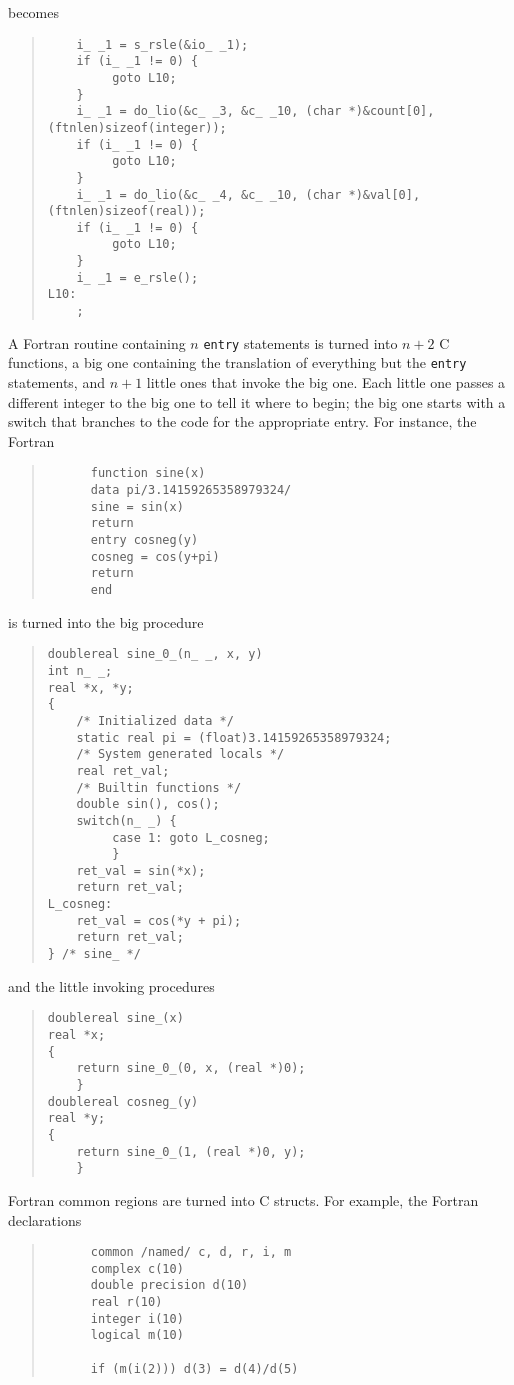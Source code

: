 \documentclass[12pt]{article}
\begin{document}
becomes
\begin{quote}
\begin{verbatim}
    i_ _1 = s_rsle(&io_ _1);
    if (i_ _1 != 0) {
         goto L10;
    }
    i_ _1 = do_lio(&c_ _3, &c_ _10, (char *)&count[0], (ftnlen)sizeof(integer));
    if (i_ _1 != 0) {
         goto L10;
    }
    i_ _1 = do_lio(&c_ _4, &c_ _10, (char *)&val[0], (ftnlen)sizeof(real));
    if (i_ _1 != 0) {
         goto L10;
    }
    i_ _1 = e_rsle();
L10:
    ;
\end{verbatim}
\end{quote}

A Fortran routine containing $n$ \verb|entry| statements is turned into $n + 2$ C functions, a big one containing the translation of everything but the \verb|entry| statements, and $n + 1$ little ones that invoke the big one. Each little one passes a different integer to the big one to tell it where to begin; the big one starts with a switch that branches to the code for the appropriate entry. For instance, the Fortran
\begin{quote}
\begin{verbatim}
      function sine(x)
      data pi/3.14159265358979324/
      sine = sin(x)
      return
      entry cosneg(y)
      cosneg = cos(y+pi)
      return
      end
\end{verbatim}
\end{quote}
is turned into the big procedure
\begin{quote}
\begin{verbatim}
doublereal sine_0_(n_ _, x, y)
int n_ _;
real *x, *y;
{
    /* Initialized data */
    static real pi = (float)3.14159265358979324;
    /* System generated locals */
    real ret_val;
    /* Builtin functions */
    double sin(), cos();
    switch(n_ _) {
         case 1: goto L_cosneg;
         }
    ret_val = sin(*x);
    return ret_val;
L_cosneg:
    ret_val = cos(*y + pi);
    return ret_val;
} /* sine_ */
\end{verbatim}
\end{quote}
and the little invoking procedures
\begin{quote}
\begin{verbatim}
doublereal sine_(x)
real *x;
{
    return sine_0_(0, x, (real *)0);
    }
doublereal cosneg_(y)
real *y;
{
    return sine_0_(1, (real *)0, y);
    }
\end{verbatim}
\end{quote}
Fortran common regions are turned into C structs. For example, the Fortran declarations
\begin{quote}
\begin{verbatim}
      common /named/ c, d, r, i, m
      complex c(10)
      double precision d(10)
      real r(10)
      integer i(10)
      logical m(10)

      if (m(i(2))) d(3) = d(4)/d(5)
\end{verbatim}
\end{quote}
\end{document}
